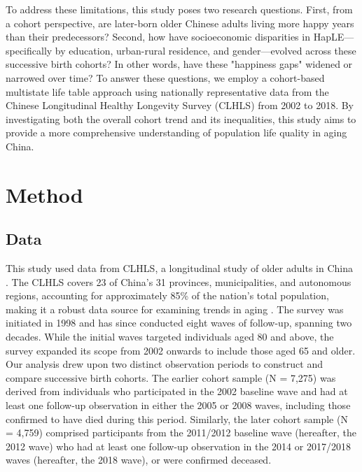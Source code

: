 \documentclass[12pt, a4paper]{article}
\begin{document}
To address these limitations, this study poses two research questions. First, from a cohort perspective, are later-born older Chinese adults living more happy years than their predecessors? Second, how have socioeconomic disparities in HapLE—specifically by education, urban-rural residence, and gender—evolved across these successive birth cohorts? In other words, have these "happiness gaps" widened or narrowed over time? To answer these questions, we employ a cohort-based multistate life table approach using nationally representative data from the Chinese Longitudinal Healthy Longevity Survey (CLHLS) from 2002 to 2018. By investigating both the overall cohort trend and its inequalities, this study aims to provide a more comprehensive understanding of population life quality in aging China.


\section{Method}
\subsection{Data}
This study used data from CLHLS, a longitudinal study of older adults in China \autocite{centerforhealthyaginganddevelopmentstudies.2020.chinese}. The CLHLS covers 23 of China’s 31 provinces, municipalities, and autonomous regions, accounting for approximately 85\% of the nation's total population, making it a robust data source for examining trends in aging \autocite{gu.2008.general,zeng.2008.introduction}. The survey was initiated in 1998 and has since conducted eight waves of follow-up, spanning two decades. While the initial waves targeted individuals aged 80 and above, the survey expanded its scope from 2002 onwards to include those aged 65 and older. Our analysis drew upon two distinct observation periods to construct and compare successive birth cohorts. The earlier cohort sample (N = 7,275) was derived from individuals who participated in the 2002 baseline wave and had at least one follow-up observation in either the 2005 or 2008 waves, including those confirmed to have died during this period. Similarly, the later cohort sample (N = 4,759) comprised participants from the 2011/2012 baseline wave (hereafter, the 2012 wave) who had at least one follow-up observation in the 2014 or 2017/2018 waves (hereafter, the 2018 wave), or were confirmed deceased.
\end{document}
